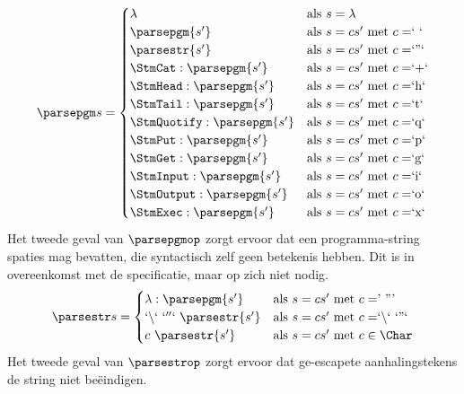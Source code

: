 $$
	\parsepgm s =
		\begin{cases}
			\lambda & \text{als $s=\lambda$}\\
            \parsepgm{s'} & \text{als $s=cs'$ met $c=$` `}\\
            \parsestr{s'} & \text{als $s=cs'$ met $c=$`''`}\\
            \StmCat:\parsepgm{s'} & \text{als $s=cs'$ met $c=$`+`}\\
            \StmHead:\parsepgm{s'} & \text{als $s=cs'$ met $c=$`h`}\\
            \StmTail:\parsepgm{s'} & \text{als $s=cs'$ met $c=$`t`}\\
            \StmQuotify:\parsepgm{s'} & \text{als $s=cs'$ met $c=$`q`}\\
            \StmPut:\parsepgm{s'} & \text{als $s=cs'$ met $c=$`p`}\\
            \StmGet:\parsepgm{s'} & \text{als $s=cs'$ met $c=$`g`}\\
            \StmInput:\parsepgm{s'} & \text{als $s=cs'$ met $c=$`i`}\\
            \StmOutput:\parsepgm{s'} & \text{als $s=cs'$ met $c=$`o`}\\
			\StmExec:\parsepgm{s'} & \text{als $s=cs'$ met $c=$`x`}\\
		\end{cases}
$$
Het tweede geval van $\parsepgmop$ zorgt ervoor dat een programma-string spaties mag bevatten, die syntactisch zelf geen betekenis hebben. Dit is in overeenkomst met de specificatie, maar op zich niet nodig.
$$
	\parsestr s =
		\begin{cases}
			\lambda:\parsepgm{s'} & \text{als $s=cs'$ met $c=$'~'''}\\
            `\backslash`~`''`~\parsestr{s'} & \text{als $s=cs'$ met $c=$`$\backslash$`~`''`}\\
            c~\parsestr{s'} & \text{als $s=cs'$ met $c \in\Char$}\\
		\end{cases}
$$
Het tweede geval van $\parsestrop$ zorgt ervoor dat ge-escapete aanhalingstekens de string niet beëindigen.


